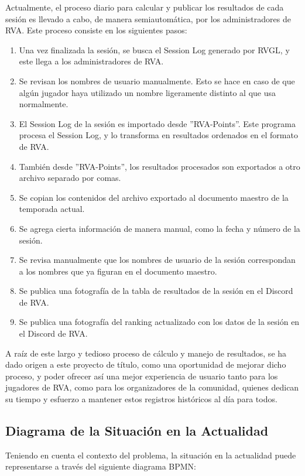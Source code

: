 Actualmente, el proceso diario para calcular y publicar los resultados de cada sesión es llevado a cabo, de manera semiautomática, por los administradores de RVA. Este proceso consiste en los siguientes pasos:

\begin{enumerate}
	\item Una vez finalizada la sesión, se busca el Session Log generado por RVGL, y este llega a los administradores de RVA.
	\item Se revisan los nombres de usuario manualmente. Esto se hace en caso de que algún jugador haya utilizado un nombre ligeramente distinto al que usa normalmente.
	\item El Session Log de la sesión es importado desde ''RVA-Points''. Este programa procesa el Session Log, y lo transforma en resultados ordenados en el formato de RVA.
	\item También desde ''RVA-Points'', los resultados procesados son exportados a otro archivo separado por comas.
	\item Se copian los contenidos del archivo exportado al documento maestro de la temporada actual.
	\item Se agrega cierta información de manera manual, como la fecha y número de la sesión.
	\item Se revisa manualmente que los nombres de usuario de la sesión correspondan a los nombres que ya figuran en el documento maestro.
	\item Se publica una fotografía de la tabla de resultados de la sesión en el Discord de RVA.
	\item Se publica una fotografía del ranking actualizado con los datos de la sesión en el Discord de RVA.
\end{enumerate}

A raíz de este largo y tedioso proceso de cálculo y manejo de resultados, se ha dado origen a este proyecto de título, como una oportunidad de mejorar dicho proceso, y poder ofrecer así una mejor experiencia de usuario tanto para los jugadores de RVA, como para los organizadores de la comunidad, quienes dedican su tiempo y esfuerzo a mantener estos registros históricos al día para todos.

\subsection{Diagrama de la Situación en la Actualidad}
Teniendo en cuenta el contexto del problema, la situación en la actualidad puede representarse a través del siguiente diagrama BPMN:

